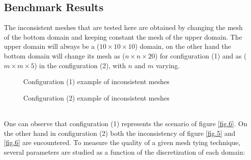  \subsection{Benchmark Results}\label{ssec42}
 The inconsistent meshes that are tested here are obtained by changing the mesh of the bottom domain and keeping constant the mesh of the upper domain. The upper domain will always be a ($10\times10\times10$) domain, on the other hand the bottom domain will change its mesh as ($n\times n\times20$) for configuration (1) and as ($m \times m \times 5$) in the configuration (2), with $n$ and $m$ varying.
    \begin{figure}[!ht]
    \centering
      \caption{Configuration (1) example of inconsistent meshes}
      \label{fig.19}
    \end{figure}
    \begin{figure}[!ht]
    \centering
      \caption{Configuration (2) example of inconsistent meshes }
      \label{fig.20}
    \end{figure}
  \\
  One can observe that configuration (1) represents the scenario of figure \ref{fig.6}. On the other hand in configuration (2) both the inconsistency of figure \ref{fig.5} and \ref{fig.6} are encountered. 
   To measure the quality of a given mesh tying technique, several parameters are studied as a function of the discretization of each domain:
